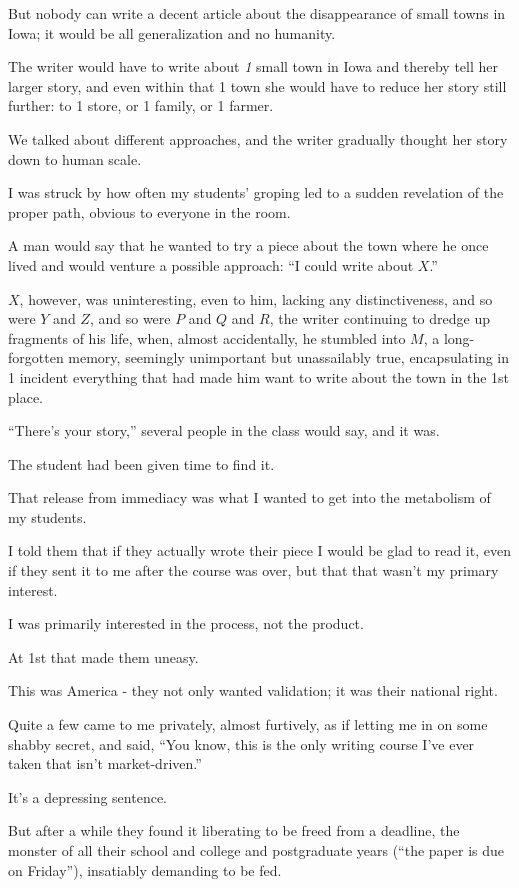 \documentclass{book}
\numberwithin{equation}{section}
\begin{document}
But nobody can write a decent article about the disappearance of small towns in Iowa; it would be all generalization and no humanity.

The writer would have to write about \textit{1} small town in Iowa and thereby tell her larger story, and even within that 1 town she would have to reduce her story still further: to 1 store, or 1 family, or 1 farmer.

We talked about different approaches, and the writer gradually thought her story down to human scale.

%
I was struck by how often my students' groping led to a sudden revelation of the proper path, obvious to everyone in the room.

A man would say that he wanted to try a piece about the town where he once lived and would venture a possible approach: ``I could write about $X$.''

$X$, however, was uninteresting, even to him, lacking any distinctiveness, and so were $Y$ and $Z$, and so were $P$ and $Q$ and $R$, the writer continuing to dredge up fragments of his life, when, almost accidentally, he stumbled into $M$, a long-forgotten memory, seemingly unimportant but unassailably true, encapsulating in 1 incident everything that had made him want to write about the town in the 1st place.

``There's your story,'' several people in the class would say, and it was.

The student had been given time to find it.

%
That release from immediacy was what I wanted to get into the metabolism of my students.

I told them that if they actually wrote their piece I would be glad to read it, even if they sent it to me after the course was over, but that that wasn't my primary interest.

I was primarily interested in the process, not the product.

At 1st that made them uneasy.

This was America - they not only wanted validation; it was their national right.

Quite a few came to me privately, almost furtively, as if letting me in on some shabby secret, and said, ``You know, this is the only writing course I've ever taken that isn't market-driven.''

It's a depressing sentence.

But after a while they found it liberating to be freed from a deadline, the monster of all their school and college and postgraduate years (``the paper is due on Friday''), insatiably demanding to be fed.
\end{document}
